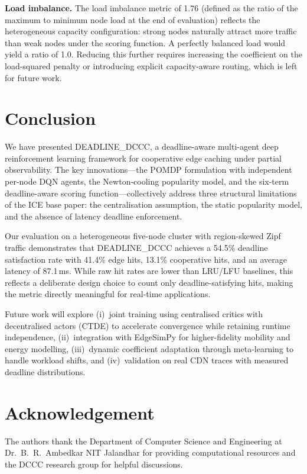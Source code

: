 \documentclass[conference]{IEEEtran}
\begin{document}
\textbf{Load imbalance.}
The load imbalance metric of 1.76 (defined as the ratio of the
maximum to minimum node load at the end of evaluation) reflects the
heterogeneous capacity configuration: strong nodes naturally attract
more traffic than weak nodes under the scoring function.  A perfectly
balanced load would yield a ratio of 1.0.  Reducing this further
requires increasing the coefficient on the load-squared penalty or
introducing explicit capacity-aware routing, which is left for future
work.

\section{Conclusion}
\label{sec:conclusion}

We have presented DEADLINE\_DCCC, a deadline-aware multi-agent deep
reinforcement learning framework for cooperative edge caching under
partial observability.  The key innovations—the POMDP formulation with
independent per-node DQN agents, the Newton-cooling popularity model,
and the six-term deadline-aware scoring function—collectively address
three structural limitations of the ICE base paper: the centralisation
assumption, the static popularity model, and the absence of latency
deadline enforcement.

Our evaluation on a heterogeneous five-node cluster with region-skewed
Zipf traffic demonstrates that DEADLINE\_DCCC achieves a 54.5\%
deadline satisfaction rate with 41.4\% edge hits, 13.1\% cooperative
hits, and an average latency of 87.1\,ms.  While raw hit rates are
lower than LRU/LFU baselines, this reflects a deliberate design choice
to count only deadline-satisfying hits, making the metric directly
meaningful for real-time applications.

Future work will explore (i)~joint training using centralised critics
with decentralised actors (CTDE) to accelerate convergence while
retaining runtime independence, (ii)~integration with EdgeSimPy for
higher-fidelity mobility and energy modelling, (iii)~dynamic coefficient
adaptation through meta-learning to handle workload shifts, and
(iv)~validation on real CDN traces with measured deadline distributions.

\section*{Acknowledgement}
The authors thank the Department of Computer Science and Engineering at
Dr.\ B.\ R.\ Ambedkar NIT Jalandhar for providing computational
resources and the DCCC research group for helpful discussions.
\end{document}
